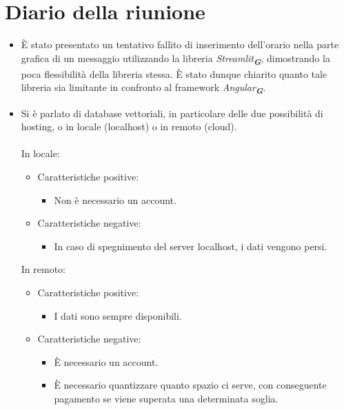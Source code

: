
\section{Diario della riunione}

\begin{itemize}
    \item È stato presentato un tentativo fallito di inserimento dell'orario nella parte grafica di un messaggio utilizzando la libreria 
    \emph{Streamlit}\textsubscript{\textit{\textbf{G}}}, dimostrando la poca flessibilità della libreria stessa. È stato dunque chiarito quanto
    tale libreria sia limitante in confronto al framework \emph{Angular}\textsubscript{\textit{\textbf{G}}}.
    \item Si è parlato di database vettoriali, in particolare delle due possibilità di hosting, o in locale (localhost) o in remoto (cloud).\\\\
    In locale:
    \begin{itemize}
        \item Caratteristiche positive:
        \begin{itemize}
            \item Non è necessario un account.
        \end{itemize}
        \item Caratteristiche negative:
        \begin{itemize}
            \item In caso di spegnimento del server localhost, i dati vengono persi.
        \end{itemize}
    \end{itemize}
    In remoto:
    \begin{itemize}
        \item Caratteristiche positive:
        \begin{itemize}
            \item I dati sono sempre disponibili.
        \end{itemize}
        \item Caratteristiche negative:
        \begin{itemize}
            \item È necessario un account.
            \item È necessario quantizzare quanto spazio ci serve, con conseguente pagamento se viene superata una determinata soglia.

\end{itemize}
\end{itemize}
\end{itemize}
